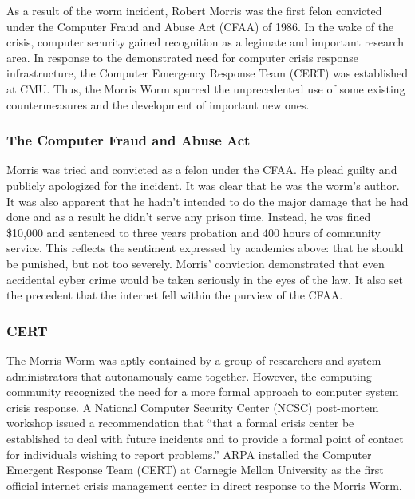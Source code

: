 As a result of the worm incident, Robert Morris was the first felon convicted
under the Computer Fraud and Abuse Act (CFAA) of 1986. In the wake of the
crisis, computer security gained recognition as a legimate and important
research area. In response to the demonstrated need for computer crisis
response infrastructure, the Computer Emergency Response Team (CERT) was
established at CMU. Thus, the Morris Worm spurred the unprecedented use of some
existing countermeasures and the development of important new ones.

\subsubsection*{The Computer Fraud and Abuse Act}
Morris was tried and convicted as a felon under the CFAA. He plead guilty and
publicly apologized for the incident. It was clear that he was the worm's
author. It was also apparent that he hadn't intended to do the major damage that
he had done and as a result he didn't serve any prison time. Instead, he was
fined \$10,000 and sentenced to three years probation and 400 hours of
community service\cite{lee_washpost_2013}. This reflects the sentiment
expressed by academics above: that he should be punished, but not too severely.
Morris' conviction demonstrated that even accidental cyber
crime would be taken seriously in the eyes of the law. It also set the
precedent that the internet fell within the purview of the
CFAA\cite{adams_controlling_1996}.

\subsubsection*{CERT}
The Morris Worm was aptly contained by a group of researchers and
system administrators that autonamously came together. However, the
computing community recognized the need for a more formal approach to computer
system crisis response. A National Computer Security Center (NCSC) post-mortem
workshop issued a recommendation that ``that a formal crisis center be
established to deal with future incidents and to provide a formal point of
contact for individuals wishing to report problems.''\cite{spafford_crisis_1989}
ARPA installed the Computer Emergent Response Team (CERT) at Carnegie Mellon
University as the first official internet crisis management center in direct
response to the Morris Worm\cite{fithen_cert_1994}.

